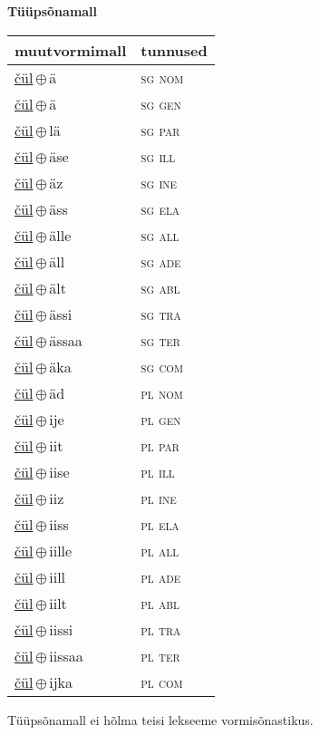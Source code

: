 

\vspace{3.5em}
\noindent \begin{minipage}{\textwidth}
\noindent \textbf{Tüüpsõnamall \,}\\

\begin{sideways}
\begin{tabular}{l l}
muutvormimall & tunnused \\
\hline
\underline{čül}\,$\oplus$\,ä & \textsc{ sg nom } \\
\underline{čül}\,$\oplus$\,ä & \textsc{ sg gen } \\
\underline{čül}\,$\oplus$\,lä & \textsc{ sg par } \\
\underline{čül}\,$\oplus$\,äse & \textsc{ sg ill } \\
\underline{čül}\,$\oplus$\,äz & \textsc{ sg ine } \\
\underline{čül}\,$\oplus$\,äss & \textsc{ sg ela } \\
\underline{čül}\,$\oplus$\,älle & \textsc{ sg all } \\
\underline{čül}\,$\oplus$\,äll & \textsc{ sg ade } \\
\underline{čül}\,$\oplus$\,ält & \textsc{ sg abl } \\
\underline{čül}\,$\oplus$\,ässi & \textsc{ sg tra } \\
\underline{čül}\,$\oplus$\,ässaa & \textsc{ sg ter } \\
\underline{čül}\,$\oplus$\,äka & \textsc{ sg com } \\
\underline{čül}\,$\oplus$\,äd & \textsc{ pl nom } \\
\underline{čül}\,$\oplus$\,ije & \textsc{ pl gen } \\
\underline{čül}\,$\oplus$\,iit & \textsc{ pl par } \\
\underline{čül}\,$\oplus$\,iise & \textsc{ pl ill } \\
\underline{čül}\,$\oplus$\,iiz & \textsc{ pl ine } \\
\underline{čül}\,$\oplus$\,iiss & \textsc{ pl ela } \\
\underline{čül}\,$\oplus$\,iille & \textsc{ pl all } \\
\underline{čül}\,$\oplus$\,iill & \textsc{ pl ade } \\
\underline{čül}\,$\oplus$\,iilt & \textsc{ pl abl } \\
\underline{čül}\,$\oplus$\,iissi & \textsc{ pl tra } \\
\underline{čül}\,$\oplus$\,iissaa & \textsc{ pl ter } \\
\underline{čül}\,$\oplus$\,ijka & \textsc{ pl com } \\
\end{tabular}
\end{sideways}
\label{tab:tüüpsõnamall-čülä}

\end{minipage}

 
\vspace{1em}
\noindent Tüüpsõnamall  ei hõlma teisi lekseeme vormi\-sõnastikus.
